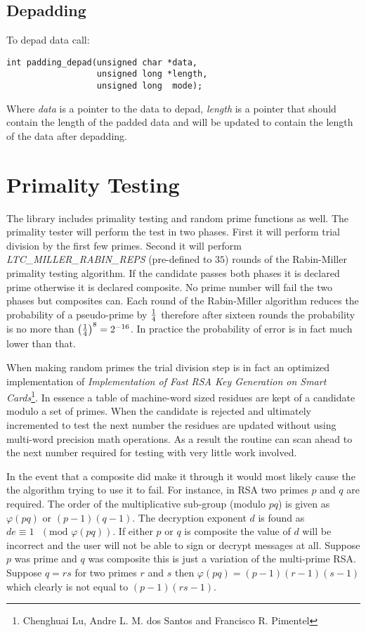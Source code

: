 \documentclass[synpaper]{book}
\def\phi{\varphi}
\newcommand{\mysection}[1]    %
	{                   %
	\section{#1}
   \markboth{\textsf{www.libtom.net}}{\thesection ~ {#1}}
	}
\begin{document}
\subsection{Depadding}

To depad data call:

\begin{verbatim}
int padding_depad(unsigned char *data,
                  unsigned long *length,
                  unsigned long  mode);
\end{verbatim}

Where \textit{data} is a pointer to the data to depad,
\textit{length} is a pointer that should contain the length of the padded data and will be updated to contain the length of the data after depadding.


\mysection{Primality Testing}
The library includes primality testing and random prime functions as well.  The primality tester will perform the test in
two phases.  First it will perform trial division by the first few primes.  Second it will perform \textit{LTC\_MILLER\_RABIN\_REPS} (pre-defined to $35$) rounds of the
Rabin-Miller primality testing algorithm.  If the candidate passes both phases it is declared prime otherwise it is declared
composite.  No prime number will fail the two phases but composites can.  Each round of the Rabin-Miller algorithm reduces
the probability of a pseudo-prime by $1 \over 4$ therefore after sixteen rounds the probability is no more than
$\left ( { 1 \over 4 } \right )^{8} = 2^{-16}$.  In practice the probability of error is in fact much lower than that.

When making random primes the trial division step is in fact an optimized implementation of \textit{Implementation of Fast RSA Key Generation on Smart Cards}\footnote{Chenghuai Lu, Andre L. M. dos Santos and Francisco R. Pimentel}.
In essence a table of machine-word sized residues are kept of a candidate modulo a set of primes.  When the candidate
is rejected and ultimately incremented to test the next number the residues are updated without using multi-word precision
math operations.  As a result the routine can scan ahead to the next number required for testing with very little work
involved.

In the event that a composite did make it through it would most likely cause the the algorithm trying to use it to fail.  For
instance, in RSA two primes $p$ and $q$ are required.  The order of the multiplicative sub-group (modulo $pq$) is given
as $\phi(pq)$ or $(p - 1)(q - 1)$.  The decryption exponent $d$ is found as $de \equiv 1\mbox{ }(\mbox{mod } \phi(pq))$.  If either $p$ or $q$ is composite the value of $d$ will be incorrect and the user
will not be able to sign or decrypt messages at all.  Suppose $p$ was prime and $q$ was composite this is just a variation of
the multi-prime RSA.  Suppose $q = rs$ for two primes $r$ and $s$ then $\phi(pq) = (p - 1)(r - 1)(s - 1)$ which clearly is
not equal to $(p - 1)(rs - 1)$.
\end{document}
